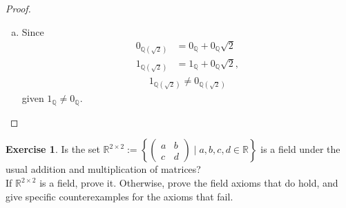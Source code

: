 \documentclass{amsart}
\newcommand{\bbr}{\mathbb{R}}
\newcommand{\bbq}{\mathbb{Q}}
\theoremstyle{plain}
\theoremstyle{definition}
\newtheorem{exer}[lem]{Exercise}
\begin{document}
\begin{proof}
\begin{enumerate}[(a)]
			where we use the multiplication commutative, associative and  distributive law of the field $\bbr$.\\
			Similarly, 
			\begin{align*}
				\Big((a+b\sqrt 2)+(c+d\sqrt 2)\Big)(e+f\sqrt 2)  &= (e+f\sqrt 2)\Big((a+b\sqrt 2)+(c+d\sqrt 2)\Big) \\ &= (e+f\sqrt 2)(a+b\sqrt 2) + (e+f\sqrt 2)(c+d\sqrt 2)\\ &= (a+b\sqrt 2)(e+f\sqrt 2) + (c+d\sqrt 2)(e+f\sqrt 2) 
			\end{align*}
		   according to previous proof steps.\\
		   \item
			Since
			  \begin{align*}
			 	  0_{\bbq(\sqrt 2)} &= 0_{\bbq} + 0_{\bbq}\sqrt 2\\
			 	  1_{\bbq(\sqrt 2)} &= 1_{\bbq} + 0_{\bbq}\sqrt 2,
		  	 \end{align*}
		  	 \begin{align*}
		  	 	 1_{\bbq(\sqrt 2)} \neq 0_{\bbq(\sqrt 2)} 
		  	 \end{align*}
		  	 given $1_{\bbq} \neq 0_{\bbq}$.
		\end{enumerate}



\end{proof}


\begin{exer}
Is
the set $\bbr^{2\times 2}:=\left\{\left(\begin{smallmatrix}a&b\\c&d\end{smallmatrix}\right)\mid a,b,c,d\in\bbr\right\}$ is a field under the usual addition and multiplication of matrices? \\

If $\bbr^{2\times 2}$ is a field, prove it.
Otherwise, prove the field axioms that do hold, and give specific counterexamples for the axioms that fail.
\end{exer}
\end{document}
